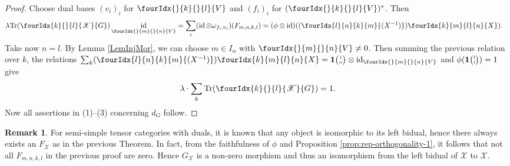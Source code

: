 \documentclass[11pt]{article}
\DeclareMathOperator{\id}{id}
\newcommand{\dual}[1]{#1^{*}}
\newcommand{\Tr}{\mathrm{Tr}}
\newcommand{\Grt}[3]{#1{\tiny {\begin{pmatrix} #2\\#3\end{pmatrix}}}}
\newcommand{\UnitC}[2]{\Grt{\mathbf{1}}{#1}{#2}}
\newcommand{\Gr}[5]{\fourIdx{#2}{#4}{#3}{#5}{#1}}%
\newcommand{\Gru}[3]{\Gr{#1}{}{}{#2}{#3}}
\theoremstyle{definition}
\newtheorem{Rem}[Theorem]{Remark}
\numberwithin{equation}{section}
\begin{document}
\begin{proof}
  Choose dual  bases
  $(v_{i})_{i}$ for $\Gru{V}{k}{l}$ and $(f_{i})_{i}$ for  $\dual{(\Gru{V}{k}{l})}$. Then
  \begin{align*}
    \lambda   \Tr( \Gr{G}{k}{l}{}{\mathscr{X}}) \id_{\Gru{V}{m}{n}}
 &= \sum_{i} (\id \otimes
    \omega_{f_{i},v_{i}})(F_{m,n,k,l}) = (\phi \otimes
    \id)((\Gr{(X^{-1})}{l}{k}{n}{m}) \Gr{X}{k}{l}{m}{n}).
  \end{align*}
  Take now $n=l$.  By Lemma \ref{LemInjMor}, we can choose $m\in I_{\alpha}$ with $\Gru{V}{m}{n}\neq 0$.   Then summing the previous relation over $k$, the relations $\sum_{k}
  (\Gr{(X^{-1})}{l}{k}{n}{m}) \Gr{X}{k}{l}{m}{n} = \UnitC{l}{n}
  \otimes \id_{\Gru{V}{m}{n}}$ and
  $\phi(\UnitC{l}{l})=1$ give
\begin{align*}
\lambda \cdot  \sum_{k} \Tr(\Gr{G}{k}{l}{}{\mathscr{X}}) = 1.  
\end{align*}
Now all assertions in (1)--(3) concerning $d_G$ follow.
\end{proof}

\begin{Rem} For semi-simple tensor categories with duals, it is known that any object is isomorphic to its left bidual, hence there always exists an $F_{\mathscr{X}}$ as in the previous Theorem. In fact, from the faithfulness of $\phi$ and Proposition \ref{prop:rep-orthogonality-1}, it follows that not all $F_{m,n,k,l}$ in the previous proof are zero. Hence $G_{\mathscr{X}}$ is a non-zero morphism and thus an isomorphism from the left bidual of $\mathscr{X}$ to $\mathscr{X}$.  
\end{Rem}
\end{document}
